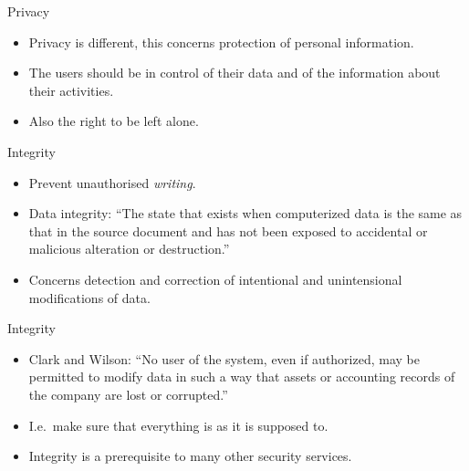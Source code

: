 \documentclass{beamer}
\begin{document}
\begin{frame}{\insertsubsectionhead}{Privacy}
  \begin{itemize}
    \item Privacy is different, this concerns protection of personal 
      information.

    \item The users should be in control of their data and of the information 
      about their activities.

    \item Also the right to be left alone.
  \end{itemize}
\end{frame}

\begin{frame}{\insertsubsectionhead}{Integrity}
  \begin{itemize}
    \item Prevent unauthorised \emph{writing}.

    \item Data integrity: ``The state that exists when computerized data is the 
      same as that in the source document and has not been exposed to 
      accidental or malicious alteration or destruction.''

    \item Concerns detection and correction of intentional and unintensional 
      modifications of data.
  \end{itemize}
\end{frame}

\begin{frame}{\insertsubsectionhead}{Integrity}
  \begin{itemize}
    \item Clark and Wilson:
      ``No user of the system, even if authorized, may be permitted to modify 
      data in such a way that assets or accounting records of the company are 
      lost or corrupted.''

    \item I.e.~make sure that everything is as it is supposed to.

    \item Integrity is a prerequisite to many other security services.
  \end{itemize}
\end{frame}
\end{document}
